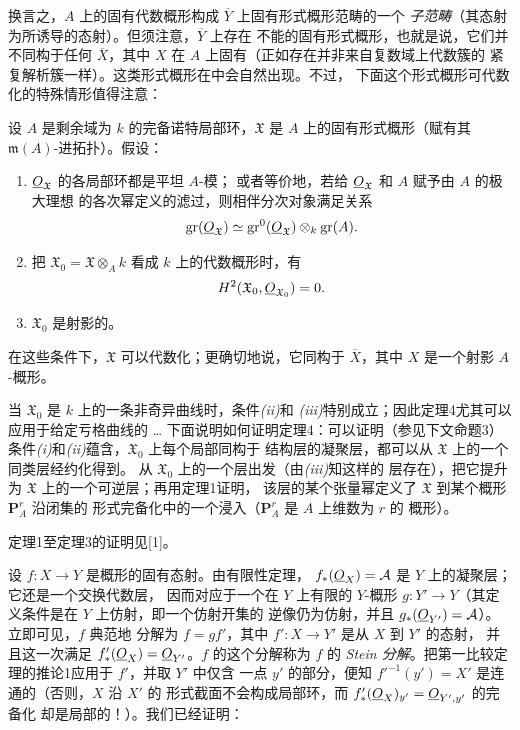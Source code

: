 换言之，$A$ 上的固有代数概形构成 $\overline Y$ 上固有形式概形范畴的一个
\emph{子范畴}（其态射为所诱导的态射）。但须注意，$\overline Y$ 上存在
不能的固有形式概形，也就是说，它们并不同构于任何
$\overline X$，其中 $X$ 在 $A$ 上固有（正如存在并非来自复数域上代数簇的
紧复解析簇一样）。这类形式概形在中会自然出现。不过，
下面这个形式概形可代数化的特殊情形值得注意：

 设 $A$ 是剩余域为 $k$ 的完备诺特局部环，$\mathfrak X$
是 $A$ 上的固有形式概形（赋有其 $\mathfrak m(A)$-进拓扑）。假设：
\begin{enumerate}
  \item[\textit{i.}] $\underline{O}_{\mathfrak X}$ 的各局部环都是平坦 $A$-模；
    或者等价地，若给 $\underline{O}_{\mathfrak X}$ 和 $A$ 赋予由 $A$ 的极大理想
    的各次幂定义的滤过，则相伴分次对象满足关系
    \[
      \operatorname{gr}(\underline{O}_{\mathfrak X})
      \simeq
      \operatorname{gr}^{0}(\underline{O}_{\mathfrak X})
      \otimes_k\operatorname{gr}(A).
    \]
  \item[\textit{ii.}] 把
    $\mathfrak X_0=\mathfrak X\otimes_A k$ 看成 $k$ 上的代数概形时，有
    \[
      H^2(\mathfrak X_0,\underline{O}_{\mathfrak X_0})=0.
    \]
  \item[\textit{iii.}] $\mathfrak X_0$ 是射影的。
\end{enumerate}
在这些条件下，$\mathfrak X$ 可以代数化；更确切地说，它同构于
$\overline X$，其中 $X$ 是一个射影 $A$-概形。

当 $\mathfrak X_0$ 是 $k$ 上的一条非奇异曲线时，条件\textit{(ii)}和
\textit{(iii)}特别成立；因此定理4尤其可以应用于给定亏格曲线的
\ldots{} 下面说明如何证明定理4：可以证明（参见下文命题3）
条件\textit{(i)}和\textit{(ii)}蕴含，$\mathfrak X_0$ 上每个局部同构于
结构层的凝聚层，都可以从 $\mathfrak X$ 上的一个同类层经约化得到。
从 $\mathfrak X_0$ 上的一个层出发（由\textit{(iii)}知这样的
层存在），把它提升为 $\mathfrak X$ 上的一个可逆层；再用定理1证明，
该层的某个张量幂定义了 $\mathfrak X$ 到某个概形 $\mathbf P_A^r$ 沿闭集的
形式完备化中的一个浸入（$\mathbf P_A^r$ 是 $A$ 上维数为 $r$ 的
概形）。

定理1至定理3的证明见[1]。


设 $f:X\longrightarrow Y$ 是概形的固有态射。由有限性定理，
$f_*(\underline{O}_X)=\mathcal A$ 是 $Y$ 上的凝聚层；它还是一个交换代数层，
因而对应于一个在 $Y$ 上有限的 $Y$-概形
$g:Y'\longrightarrow Y$（其定义条件是在 $Y$ 上仿射，即一个仿射开集的
逆像仍为仿射，并且 $g_*(\underline{O}_{Y'})=\mathcal A$）。立即可见，$f$ 典范地
分解为 $f=gf'$，其中 $f':X\longrightarrow Y'$ 是从 $X$ 到 $Y'$ 的态射，
并且这一次满足 $f'_*(\underline{O}_X)=\underline{O}_{Y'}$。$f$ 的这个分解称为 $f$ 的
\emph{Stein 分解}。把第一比较定理的推论1应用于 $f'$，并取 $Y'$ 中仅含
一点 $y'$ 的部分，便知 $f'^{-1}(y')=X'$ 是连通的（否则，$X$ 沿 $X'$ 的
形式截面不会构成局部环，而 $f'_*(\underline{O}_X)_{y'}=\underline{O}_{Y',y'}$ 的完备化
却是局部的！）。我们已经证明：

